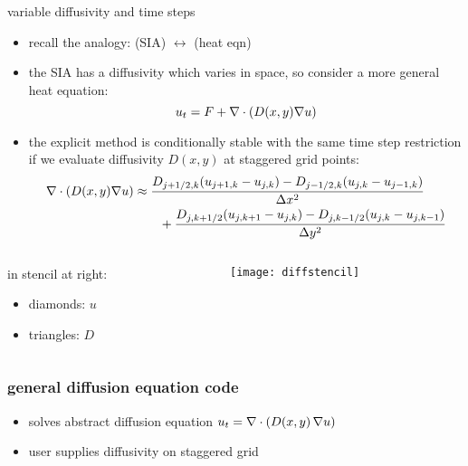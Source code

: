 \begin{frame}{variable diffusivity and time steps}

\begin{itemize}
  \item recall the analogy: \qquad (SIA) $\leftrightarrow$ (heat eqn)
  \item the SIA has a diffusivity which varies in space, so consider a more general heat equation:
  		$$u_t = F + \nabla\cdot \left(D(x,y) \nabla u\right)$$
  \item the explicit method is conditionally stable with the same time step restriction if we evaluate diffusivity $D(x,y)$ at \alert{staggered} grid points:
  \scriptsize
\begin{align*}
\nabla\cdot \left(D(x,y) \nabla u\right) &\approx \frac{D_{j+1/2,k}(u_{j+1,k} - u_{j,k}) - D_{j-1/2,k}(u_{j,k} - u_{j-1,k})}{\Delta x^2} \\
	&\qquad + \frac{D_{j,k+1/2}(u_{j,k+1} - u_{j,k}) - D_{j,k-1/2}(u_{j,k} - u_{j,k-1})}{\Delta y^2}
\end{align*}
\end{itemize}

\vspace{-0.15in}
\small
\begin{columns}
\begin{column}{0.55\textwidth}
in stencil at right:
\begin{itemize}
\item[] diamonds: $u$
\item[] triangles: $D$
\end{itemize}
\end{column}
\begin{column}{0.45\textwidth}
\begin{center}
\texttt{[image: diffstencil]}
\end{center}
\end{column}
\end{columns}
\end{frame}


\begin{frame}
  \frametitle{general diffusion equation code}


\small
\begin{itemize}
\item solves abstract diffusion equation $u_t = \nabla\cdot \left(D(x,y)\, \nabla u\right)$
\item user supplies diffusivity on staggered grid
\end{itemize}
\end{frame}


